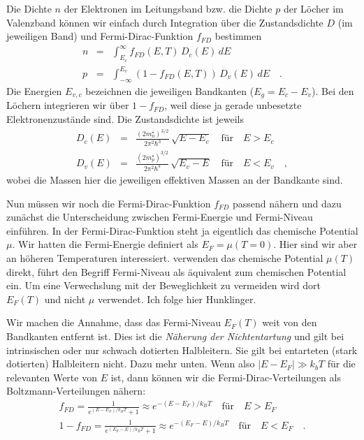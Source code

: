 Die Dichte $n$ der Elektronen im Leitungsband bzw. die Dichte $p$ der Löcher im Valenzband können wir einfach durch Integration über die Zustandsdichte $D$ (im jeweiligen Band) und Fermi-Dirac-Funktion $f_{FD}$ bestimmen
\begin{eqnarray}
    n &= & \int_{E_c}^\infty f_{FD}(E,T) \, D_c(E) \, dE \\
    p &= & \int_{-\infty}^{E_v} (1 - f_{FD}(E,T)) \, D_v(E) \, dE  \quad .
\end{eqnarray}
Die Energien $E_{v,c}$ bezeichnen die jeweiligen Bandkanten ($E_g = E_c - E_v$). Bei den Löchern integrieren wir über $1-f_{FD}$, weil diese ja gerade unbesetzte Elektronenzustände sind. Die Zustandsdichte ist jeweils
\begin{eqnarray}
    D_c(E) &= & \frac{ (2 m^\star_n)^{3/2} } {2 \pi^2 \hbar^3} \, \sqrt{E - E_c}   \quad \text{für} \quad E > E_c \\
    D_v(E) &= & \frac{ (2 m^\star_p)^{3/2} } {2 \pi^2 \hbar^3} \, \sqrt{E_v - E} \quad \text{für} \quad E < E_v \quad ,
\end{eqnarray}
wobei die Massen hier die jeweiligen effektiven Massen an der Bandkante sind.

Nun müssen wir noch die Fermi-Dirac-Funktion $f_{FD}$  passend nähern und dazu zunächst die Unterscheidung zwischen Fermi-Energie und Fermi-Niveau einführen. In der Fermi-Dirac-Funktion steht ja eigentlich das chemische Potential $\mu$. Wir hatten die Fermi-Energie definiert als $E_F = \mu(T=0)$. Hier sind wir aber an höheren Temperaturen interessiert. \cite{Gross_FK} verwenden das chemische Potential $\mu(T)$ direkt, \cite{Hunklinger2014} führt den Begriff Fermi-Niveau als äquivalent zum chemischen Potential ein. Um eine Verwechslung mit der Beweglichkeit zu vermeiden wird dort $E_F(T)$ und nicht $\mu$ verwendet. Ich folge hier Hunklinger.

Wir machen die Annahme, dass das Fermi-Niveau $E_F(T)$ weit von den Bandkanten entfernt ist. Dies ist die \emph{Näherung der Nichtentartung} und gilt bei intrinsischen oder nur schwach dotierten Halbleitern. Sie gilt bei entarteten (stark dotierten) Halbleitern nicht. Dazu mehr unten. Wenn also $|E - E_F| \gg k_b T$ für die relevanten Werte von $E$ ist, dann können wir die Fermi-Dirac-Verteilungen als Boltzmann-Verteilungen nähern:
\begin{eqnarray}
    f_{FD} = \frac{1}{e^{ (E- E_F) / k_B T} +1 } \approx e^{ -(E- E_F) / k_B T}  \quad \text{für} \quad E > E_F \\
  1-  f_{FD} = \frac{1}{e^{ (E_F - E) / k_B T} +1 } \approx e^{ -(E_F - E) / k_B T}  \quad \text{für} \quad E < E_F  \quad .
\end{eqnarray}

